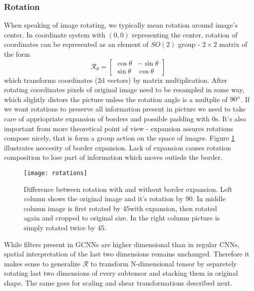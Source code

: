     \subsubsection{Rotation}
        When speaking of image rotating, we typically mean rotation around
        image's center. In coordinate system with $(0,0)$ representing the
        center, rotation of coordinates
        can be represented as an element of $SO(2)$ group - $2\times2$ matrix of
        the form
        $$\mathcal{R}_\theta = \begin{bmatrix}
                \cos\theta & -\sin\theta \\
                \sin\theta &  \cos\theta
            \end{bmatrix}$$
        which transforms coordinates (2d vectors) by matrix multiplication.
        After rotating coordinates pixels of original image need to be resampled
        in some way, which slightly distors the picture unless the rotation angle
        is a multplie of $90\degree$. If we want rotations to preserve all
        information present in picture
        we need to take care of appriopriate
        expansion of borders and possible padding with 0s.
        It's also important from more theoretical point of view - expansion
        assures rotations compose nicely, that is form a group
        action on the space of images.
        Figure
        \ref{fig:rotation_pics} illustrates neccesity of border expansion.
        Lack of expansion causes rotation composition to lose part of
        information which moves outisde the border.

        \begin{figure}[h]
            \centering
            \texttt{[image: rotations]}
            \caption{Difference between rotation with and without border
                expansion. Left column shows the original image and it's
                rotation by 90\degree. In middle column image is first rotated
                by 45\degree with expansion, then rotated again and cropped to
                original size. In the right column picture is simply rotated
                twice by 45\degree.}
            \label{fig:rotation_pics}
        \end{figure}
        While filters present in GCNNs are higher dimensional than in regular
        CNNs, spatial interpretation of the last two dimensions remains
        unchanged. Therefore it makes sense to generalize $\mathcal{R}$ to
        transform N-dimensional tensor by separetely rotating last two
        dimensions of every subtensor and stacking them in original shape.
        The same goes for scaling and shear transformations described next.

